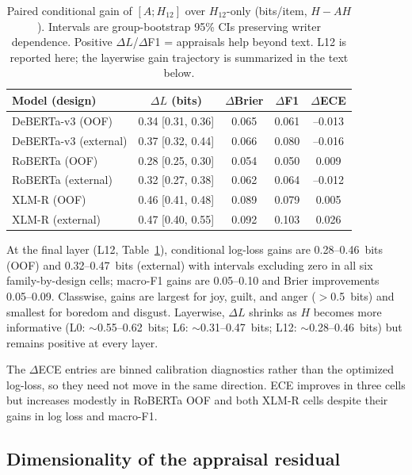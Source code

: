 \documentclass[11pt]{article}
\begin{document}
\begin{table}[h]
\centering\footnotesize
\begin{tabular}{lcccc}
\toprule
Model (design) & $\Delta L$ (bits) & $\Delta$Brier & $\Delta$F1 & $\Delta$ECE \\
\midrule
DeBERTa-v3 (OOF) & 0.34 [0.31, 0.36] & 0.065 & 0.061 & --0.013 \\
DeBERTa-v3 (external) & 0.37 [0.32, 0.44] & 0.066 & 0.080 & --0.016 \\
RoBERTa (OOF) & 0.28 [0.25, 0.30] & 0.054 & 0.050 & 0.009 \\
RoBERTa (external) & 0.32 [0.27, 0.38] & 0.062 & 0.064 & --0.012 \\
XLM-R (OOF) & 0.46 [0.41, 0.48] & 0.089 & 0.079 & 0.005 \\
XLM-R (external) & 0.47 [0.40, 0.55] & 0.092 & 0.103 & 0.026 \\
\bottomrule
\end{tabular}
\caption{Paired conditional gain of $[A;H_{12}]$ over $H_{12}$-only (bits/item, $H-AH$). Intervals are group-bootstrap 95\% CIs preserving writer dependence. Positive $\Delta L$/$\Delta$F1 = appraisals help beyond text. L12 is reported here; the layerwise gain trajectory is summarized in the text below.}
\label{tab:conditional}
\end{table}

At the final layer (L12, Table~\ref{tab:conditional}), conditional log-loss gains are 0.28--0.46~bits (OOF) and 0.32--0.47~bits (external) with intervals excluding zero in all six family-by-design cells; macro-F1 gains are 0.05--0.10 and Brier improvements 0.05--0.09. Classwise, gains are largest for joy, guilt, and anger ($>$0.5~bits) and smallest for boredom and disgust. Layerwise, $\Delta L$ shrinks as $H$ becomes more informative (L0: $\sim$0.55--0.62~bits; L6: $\sim$0.31--0.47~bits; L12: $\sim$0.28--0.46~bits) but remains positive at every layer.

The $\Delta$ECE entries are binned calibration diagnostics rather than the optimized log-loss, so they need not move in the same direction. ECE improves in three cells but increases modestly in RoBERTa OOF and both XLM-R cells despite their gains in log loss and macro-F1.

\subsection{Dimensionality of the appraisal residual}
\end{document}
